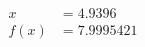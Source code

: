 \documentclass[preview]{standalone}
\begin{document}
\begin{align*}
x &= 4.9396\\f(x) &= 7.9995421
\end{align*}
\end{document}
